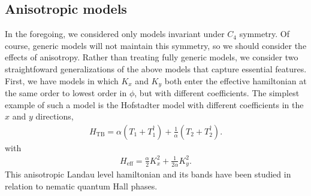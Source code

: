 \documentclass[aps,prb,twocolumn,letterpaper,twoside,nobalancelastpage,groupedaddress,amsmath,amssymb,floatfix,citeautoscript]{revtex4-1}
\begin{document}
\subsection{Anisotropic models}
In the foregoing, we considered only models invariant under $C_4$ symmetry. Of course, generic models will not maintain this symmetry, so we should consider the effects of anisotropy. Rather than treating fully generic models, we consider two straightfoward generalizations of the above models that capture essential features. First, we have models in which $K_x$ and $K_y$ both enter the effective hamiltonian at the same order to lowest order in $\phi$, but with different coefficients. The simplest example of such a model is the Hofstadter model with different coefficients in the $x$ and $y$ directions,
\begin{align}
\label{aniso-tightbinding}
H_{\text{TB}} = \alpha(T_1 + T_1^{\dag}) +  \frac{1}{\alpha}(T_2 + T_2^{\dag}).
\end{align}
 with
\begin{align*}
H_{\text{eff}} = \frac{\alpha}{2} K_x^{2} +  \frac{1}{2\alpha}K_y^{2}.
\end{align*}
This anisotropic Landau level hamiltonian and its bands have been studied in relation to nematic quantum Hall phases.
\end{document}
